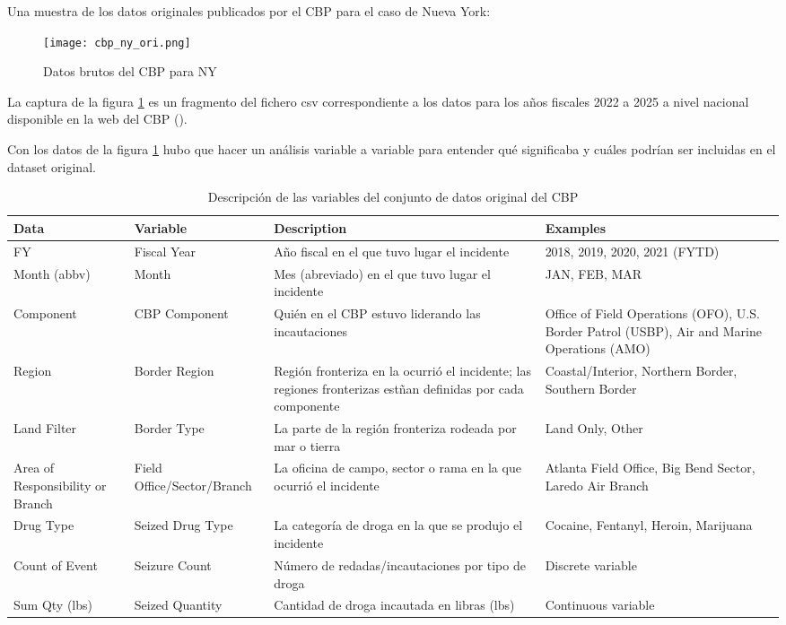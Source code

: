 \documentclass[12pt]{article}
\begin{document}
		 Una muestra de los datos originales publicados por el CBP para el caso de Nueva York:
		\begin{figure}[H]
			\caption{\label{cbp_ny_ori} Datos brutos del CBP para NY}
			\centering
			\hspace*{1cm}
			\texttt{[image: cbp\_ny\_ori.png]}
		\end{figure}
	
		La captura de la figura \ref{cbp_ny_ori} es un fragmento del fichero csv correspondiente a los datos para los años fiscales 2022 a 2025 a nivel nacional disponible en la web del CBP (\cite{cbp2025drugseizures}).
		
		Con los datos de la figura \ref{cbp_ny_ori} hubo que hacer un análisis variable a variable para entender qué significaba y cuáles podrían ser incluidas en el dataset original.
		
		\begingroup
		\begin{table}[H]
			\centering
			\caption{\label{original_CBP}Descripción de las variables del conjunto de datos original del CBP}
			\label{tabla_variables}
			\begin{tabular}{|l|l|p{7cm}|p{4cm}|}
				\hline
				\textbf{Data} & \textbf{Variable} & \textbf{Description} & \textbf{Examples} \\
				\hline
				FY & Fiscal Year & Año fiscal en el que tuvo lugar el incidente & 2018, 2019, 2020, 2021 (FYTD) \\
				\hline
				Month (abbv) & Month & Mes (abreviado) en el que tuvo lugar el incidente & JAN, FEB, MAR \\
				\hline
				Component & CBP Component & Quién en el CBP estuvo liderando las incautaciones & Office of Field Operations (OFO), U.S. Border Patrol (USBP), Air and Marine Operations (AMO) \\
				\hline
				Region & Border Region & Región fronteriza en la ocurrió el incidente; las regiones fronterizas estñan definidas por cada componente & Coastal/Interior, Northern Border, Southern Border \\
				\hline
				Land Filter & Border Type & La parte de la región fronteriza rodeada por mar o tierra & Land Only, Other \\
				\hline
				Area of Responsibility or Branch & Field Office/Sector/Branch & La oficina de campo, sector o rama en la que ocurrió el incidente & Atlanta Field Office, Big Bend Sector, Laredo Air Branch \\
				\hline
				Drug Type & Seized Drug Type & La categoría de droga en la que se produjo el incidente & Cocaine, Fentanyl, Heroin, Marijuana \\
				\hline
				Count of Event & Seizure Count & Número de redadas/incautaciones por tipo de droga & Discrete variable \\
				\hline
				Sum Qty (lbs) & Seized Quantity & Cantidad de droga incautada en libras (lbs) & Continuous variable \\
				\hline
			\end{tabular}
		\end{table}
		\endgroup
		
\end{document}
